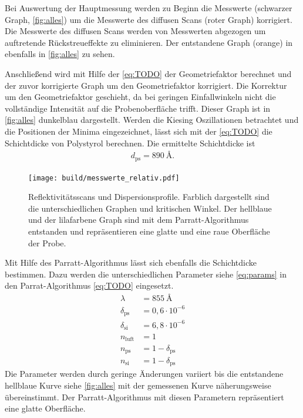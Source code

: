 Bei Auswertung der Hauptmessung werden zu Beginn die Messwerte (schwarzer Graph, \autoref{fig:alles}) um die Messwerte des
diffusen Scans (roter Graph) korrigiert. Die Messwerte des diffusen Scans werden von Messwerten abgezogen um auftretende Rückstreueffekte zu 
eliminieren. Der entstandene Graph (orange) in ebenfalls in \autoref{fig:alles} zu sehen. 

Anschließend wird mit Hilfe der \autoref{eq:TODO} der Geometriefaktor berechnet und der zuvor korrigierte Graph um den Geometriefaktor korrigiert. 
Die Korrektur um den Geometriefaktor geschieht, da bei geringen Einfallwinkeln nicht die vollständige Intensität auf die Probenoberfläche trifft. 
Dieser Graph ist in \autoref{fig:alles} dunkelblau dargestellt. 
Werden die Kiesing Oszillationen betrachtet und die Positionen der Minima eingezeichnet, lässt sich mit der \autoref{eq:TODO} die 
Schichtdicke von Polystyrol berechnen.
Die ermittelte Schichtdicke ist
\begin{align*}
    d_\text{ps} = \SI{890}{\angstrom}.
\end{align*}
\begin{figure}
    \centering
    \texttt{[image: build/messwerte\_relativ.pdf]}
    \caption{Reflektivitätsscans und Dispersionsprofile. Farblich dargestellt sind die unterschiedlichen Graphen und kritischen Winkel.
            Der hellblaue und der lilafarbene Graph sind mit dem Parratt-Algorithmus entstanden und repräsentieren eine glatte und eine raue Oberfläche der Probe. }
    \label{fig:alles}
\end{figure}
\FloatBarrier
Mit Hilfe des Parratt-Algorithmus lässt sich ebenfalls die Schichtdicke bestimmen. 
Dazu werden die unterschiedlichen Parameter siehe \autoref{eq:params} in den Parrat-Algorithmus \autoref{eq:TODO} eingesetzt.
\begin{equation}\label{eq:params}    
    \begin{split}
        \lambda &= \SI{855}{\angstrom}\\
        \delta_\text{ps} &= 0,6\cdot 10^{-6}\\
        \delta_\text{si}&= 6,8\cdot 10^{-6} \\
        n_\text{luft} &= 1 \\
        n_\text{ps} &= 1 - \delta_\text{ps} \\
        n_\text{si} &= 1 - \delta_\text{ps} 
    \end{split}
\end{equation}
Die Parameter werden durch geringe Änderungen variiert bis die entstandene hellblaue Kurve siehe \autoref{fig:alles} mit der gemessenen
Kurve näherungsweise übereinstimmt. 
Der Parratt-Algorithmus mit diesen Parametern repräsentiert eine glatte Oberfläche.

